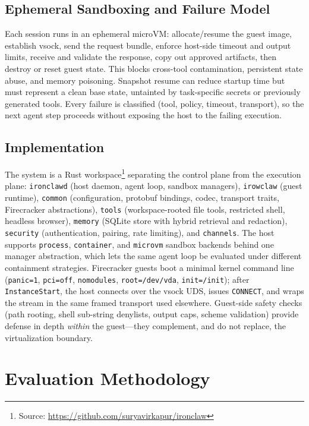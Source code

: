 \documentclass[conference]{IEEEtran}
\begin{document}
\subsection{Ephemeral Sandboxing and Failure Model}
Each session runs in an ephemeral microVM: allocate/resume the guest image,
establish vsock, send the request bundle, enforce host-side timeout and output
limits, receive and validate the response, copy out approved artifacts, then
destroy or reset guest state. This blocks cross-tool contamination, persistent
state abuse, and memory poisoning. Snapshot resume can reduce startup time but
must represent a clean base state, untainted by task-specific secrets or
previously generated tools. Every failure is classified (tool, policy,
timeout, transport), so the next agent step proceeds without exposing the host
to the failing execution.

\subsection{Implementation}
The system is a Rust workspace\footnote{Source:
\url{https://github.com/suryavirkapur/ironclaw}} separating the control plane
from the execution plane: \texttt{ironclawd} (host daemon, agent loop, sandbox
managers), \texttt{irowclaw} (guest runtime), \texttt{common} (configuration,
protobuf bindings, codec, transport traits, Firecracker abstractions),
\texttt{tools} (workspace-rooted file tools, restricted shell, headless
browser), \texttt{memory} (SQLite store with hybrid retrieval and redaction),
\texttt{security} (authentication, pairing, rate limiting), and
\texttt{channels}. The host supports \texttt{process}, \texttt{container}, and
\texttt{microvm} sandbox backends behind one manager abstraction, which lets
the same agent loop be evaluated under different containment strategies.
Firecracker guests boot a minimal kernel command line (\texttt{panic=1},
\texttt{pci=off}, \texttt{nomodules}, \texttt{root=/dev/vda},
\texttt{init=/init}); after \texttt{InstanceStart}, the host connects over the
vsock UDS, issues \texttt{CONNECT}, and wraps the stream in the same framed
transport used elsewhere. Guest-side safety checks (path rooting, shell
sub-string denylists, output caps, scheme validation) provide defense in depth
\emph{within} the guest---they complement, and do not replace, the
virtualization boundary.

\section{Evaluation Methodology}
\label{sec:methodology}
\end{document}
